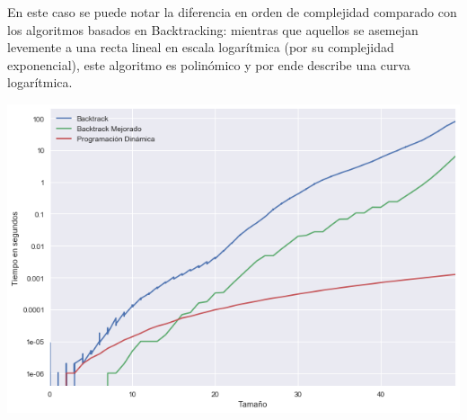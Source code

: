 	En este caso se puede notar la diferencia en orden de complejidad comparado con los algoritmos basados en Backtracking: mientras que aquellos se asemejan levemente a una recta lineal en escala logarítmica (por su complejidad exponencial), este algoritmo es polinómico y por ende describe una curva logarítmica.

	\begin{center}
	\includegraphics[width=.8\textwidth]{ej3-2.png}
	\end{center}